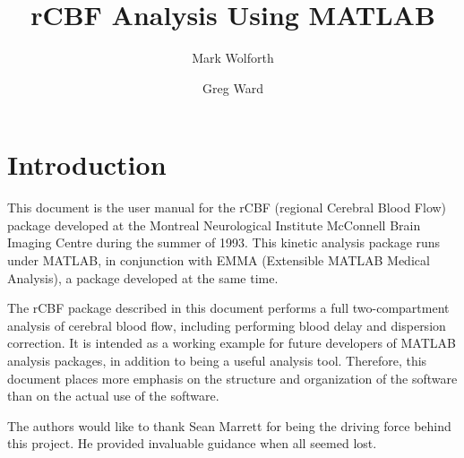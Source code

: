
\title{rCBF Analysis Using MATLAB}
\author{Mark Wolforth \and Greg Ward}
\def\code#1{{\tt #1}}


\def\ttlabel#1{{\tt #1: }}
\newenvironment{ttdescription}[1]
{\newbox\holder
 \setbox\holder=\hbox{\ttlabel#1}
 \dimen0=\wd\holder
 \begin{list}{}
 {\labelsep=-0.25in
  \rightmargin=0.25in
  \leftmargin=\dimen0
  \addtolength{\leftmargin}{0.25in}
  \labelwidth=\leftmargin
  \let\makelabel\ttlabel}}%
{\end{list}}



\maketitle

\tableofcontents

\newpage
\section{Introduction}

This document is the user manual for the rCBF (regional Cerebral
Blood Flow) package developed at the Montreal Neurological Institute
McConnell Brain Imaging Centre during the summer of 1993.  This
kinetic analysis package runs under MATLAB, in conjunction with EMMA
(Extensible MATLAB Medical Analysis), a package developed at the same
time.

The rCBF package described in this document performs a full
two-compartment analysis of cerebral blood flow, including performing
blood delay and dispersion correction.  It is intended as a working
example for future developers of MATLAB analysis packages, in
addition to being a useful analysis tool.  Therefore, this document
places more emphasis on the structure and organization of the
software than on the actual use of the software.

The authors would like to thank Sean Marrett for being the driving
force behind this project.  He provided invaluable guidance when all
seemed lost.

\newpage
